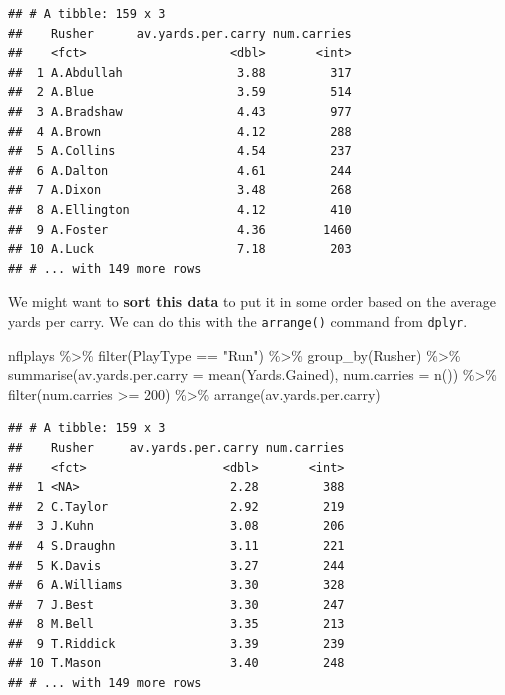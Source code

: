 \documentclass[
]{book}
\newenvironment{Shaded}{\begin{snugshade}}{\end{snugshade}}
\newcommand{\AttributeTok}[1]{\textcolor[rgb]{0.77,0.63,0.00}{#1}}
\newcommand{\DecValTok}[1]{\textcolor[rgb]{0.00,0.00,0.81}{#1}}
\newcommand{\FunctionTok}[1]{\textcolor[rgb]{0.00,0.00,0.00}{#1}}
\newcommand{\NormalTok}[1]{#1}
\newcommand{\SpecialCharTok}[1]{\textcolor[rgb]{0.00,0.00,0.00}{#1}}
\newcommand{\StringTok}[1]{\textcolor[rgb]{0.31,0.60,0.02}{#1}}
\theoremstyle{definition}
\theoremstyle{definition}
\theoremstyle{definition}
\theoremstyle{definition}
\theoremstyle{remark}
\begin{document}
\begin{verbatim}
## # A tibble: 159 x 3
##    Rusher      av.yards.per.carry num.carries
##    <fct>                    <dbl>       <int>
##  1 A.Abdullah                3.88         317
##  2 A.Blue                    3.59         514
##  3 A.Bradshaw                4.43         977
##  4 A.Brown                   4.12         288
##  5 A.Collins                 4.54         237
##  6 A.Dalton                  4.61         244
##  7 A.Dixon                   3.48         268
##  8 A.Ellington               4.12         410
##  9 A.Foster                  4.36        1460
## 10 A.Luck                    7.18         203
## # ... with 149 more rows
\end{verbatim}

We might want to \textbf{sort this data} to put it in some order based on the average yards per carry. We can do this with the \texttt{arrange()} command from \texttt{dplyr}.

\begin{Shaded}
\begin{Highlighting}[]
\NormalTok{nflplays }\SpecialCharTok{\%\textgreater{}\%}
    \FunctionTok{filter}\NormalTok{(PlayType }\SpecialCharTok{==} \StringTok{"Run"}\NormalTok{) }\SpecialCharTok{\%\textgreater{}\%}
    \FunctionTok{group\_by}\NormalTok{(Rusher) }\SpecialCharTok{\%\textgreater{}\%}
    \FunctionTok{summarise}\NormalTok{(}\AttributeTok{av.yards.per.carry =} \FunctionTok{mean}\NormalTok{(Yards.Gained), }\AttributeTok{num.carries =} \FunctionTok{n}\NormalTok{()) }\SpecialCharTok{\%\textgreater{}\%}
    \FunctionTok{filter}\NormalTok{(num.carries }\SpecialCharTok{\textgreater{}=} \DecValTok{200}\NormalTok{) }\SpecialCharTok{\%\textgreater{}\%}
    \FunctionTok{arrange}\NormalTok{(av.yards.per.carry)}
\end{Highlighting}
\end{Shaded}

\begin{verbatim}
## # A tibble: 159 x 3
##    Rusher     av.yards.per.carry num.carries
##    <fct>                   <dbl>       <int>
##  1 <NA>                     2.28         388
##  2 C.Taylor                 2.92         219
##  3 J.Kuhn                   3.08         206
##  4 S.Draughn                3.11         221
##  5 K.Davis                  3.27         244
##  6 A.Williams               3.30         328
##  7 J.Best                   3.30         247
##  8 M.Bell                   3.35         213
##  9 T.Riddick                3.39         239
## 10 T.Mason                  3.40         248
## # ... with 149 more rows
\end{verbatim}
\end{document}
